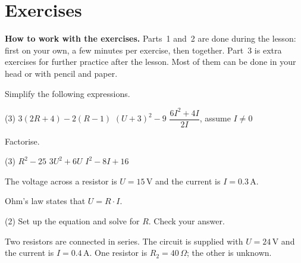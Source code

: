 
\section{Exercises}
\label{c3:sec:uppgifter}

\begin{aside}
\textbf{How to work with the exercises.} Parts~1 and~2 are done during the lesson: first on your
own, a few minutes per exercise, then together. Part~3 is extra exercises for further practice
after the lesson. Most of them can be done in your head or with pencil and paper.

\end{aside}


Simplify the following expressions.
\begin{delar}(3)
  \task $3(2R + 4) - 2(R - 1)$
  \task $(U + 3)^2 - 9$
  \task $\dfrac{6I^2 + 4I}{2I}$, assume $I \neq 0$
\end{delar}

Factorise.
\begin{delar}(3)
  \task $R^2 - 25$
  \task $3U^2 + 6U$
  \task $I^2 - 8I + 16$
\end{delar}


The voltage across a resistor is $U = 15\,\text{V}$ and the current is $I = 0.3\,\text{A}$.


Ohm's law states that $U = R \cdot I$.
\begin{delar}(2)
  \task Set up the equation and solve for $R$.
  \task Check your answer.
\end{delar}

Two resistors are connected in series. The circuit is supplied with $U = 24\,\text{V}$ and the
current is $I = 0.4\,\text{A}$. One resistor is $R_2 = 40\,\Omega$; the other is unknown.

